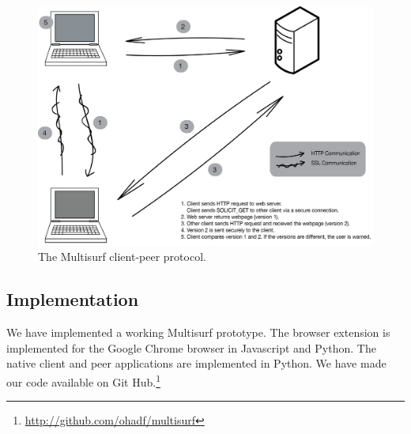\begin{figure}[h]
\centering
\includegraphics[scale=0.4]{./Protocol.png}
\caption{The Multisurf client-peer protocol.}
\label{fig:protocol}
\end{figure}

\subsection{Implementation}
We have implemented a working Multisurf prototype. The browser extension is implemented for the Google Chrome browser in Javascript and Python. The native client and peer applications are implemented in Python. We have made our code available on Git Hub.\footnote{\url{http://github.com/ohadf/multisurf}}
